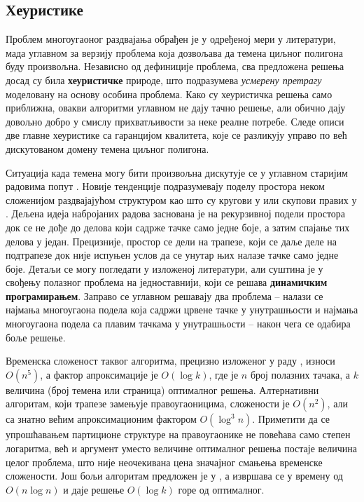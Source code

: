 \documentclass[a4paper]{article}
\begin{document}
\subsection{Хеуристике}

Проблем многоугаоног раздвајања обрађен је у одређеној мери у литератури, мада углавном за верзију проблема која дозвољава да темена циљног полигона буду произвољна. Независно од дефиниције проблема, сва предложена решења досад су била \textbf{хеуристичке} природе, што подразумева \textit{усмерену претрагу} моделовану на основу особина проблема. Како су хеуристичка решења само приближна, овакви алгоритми углавном не дају тачно решење, али обично дају довољно добро у смислу прихватљивости за неке реалне потребе. Следе описи две главне хеуристике са гаранцијом квалитета, које се разликују управо по већ дискутованом домену темена циљног полигона.

Ситуација када темена могу бити произвољна дискутује се у углавном старијим радовима попут \cite{arora}. Новије тенденције подразумевају поделу простора неком сложенијом раздвајајућом структуром као што су кругови у \cite{cheung} или скупови правих у \cite{bonnet}. Дељена идеја набројаних радова заснована је на рекурзивној подели простора док се не дође до делова који садрже тачке само једне боје, а затим спајање тих делова у један. Прецизније, простор се дели на трапезе, који се даље деле на подтрапезе док није испуњен услов да се унутар њих налазе тачке само једне боје. Детаљи се могу погледати у изложеној литератури, али суштина је у свођењу полазног проблема на једноставнији, који се решава \textbf{динамичким програмирањем}. Заправо се углавном решавају два проблема -- налази се најмања многоугаона подела која садржи црвене тачке у унутрашњости и најмања многоугаона подела са плавим тачкама у унутрашњости -- након чега се одабира боље решење.

Временска сложеност таквог алгоритма, прецизно изложеног у раду \cite{mata}, износи $O(n^5)$, а фактор апроксимације је $O(\log k)$, где је $n$ број полазних тачака, а $k$ величина (број темена или страница) оптималног решења. Алтернативни алгоритам, који трапезе замењује правоугаоницима, сложености је $O(n^2)$, али са знатно већим апроксимационим фактором  $O(\log^3n)$. Приметити да се упрошћавањем партиционе структуре на правоугаонике не повећава само степен логаритма, већ и аргумент уместо величине оптималног решења постаје величина целог проблема, што није неочекивана цена значајног смањења временске сложености. Још бољи алгоритам предложен је у \cite{gud}, а извршава се у времену од $O(n\log n)$ и даје решење $O(\log k)$ горе од оптималног.
\end{document}

